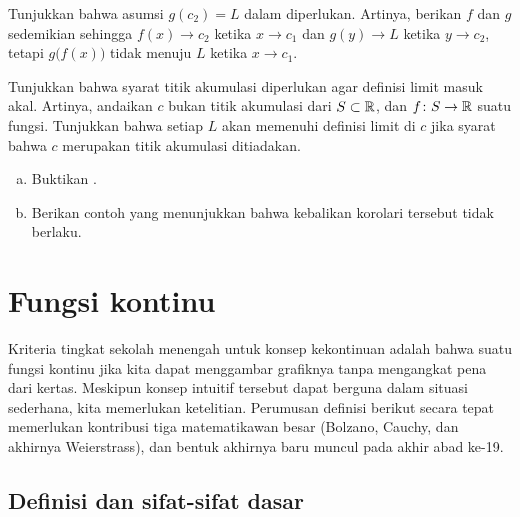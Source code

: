 \begin{exercise}[Menantang] \label{exercise:contlimitbadcomposition}
Tunjukkan bahwa asumsi $g(c_2) = L$ dalam
 diperlukan.  Artinya, berikan $f$
dan $g$ sedemikian sehingga $f(x) \to c_2$ ketika $x \to c_1$ dan
$g(y) \to L$ ketika $y \to c_2$, tetapi $g\bigl(f(x)\bigr)$ tidak menuju $L$
ketika $x \to c_1$.
\end{exercise}

\begin{exercise}
Tunjukkan bahwa syarat titik akumulasi diperlukan agar definisi limit
masuk akal.  Artinya, andaikan $c$ bukan titik akumulasi
dari $S \subset {\mathbb{R}}$, dan $f \colon S \to {\mathbb{R}}$ suatu fungsi.  Tunjukkan bahwa
setiap $L$ akan memenuhi definisi limit di $c$ jika syarat
bahwa $c$ merupakan titik akumulasi ditiadakan.
\end{exercise}

\begin{exercise}
\leavevmode
\begin{enumerate}[a)]
\item
Buktikan .
\item
Berikan contoh yang menunjukkan bahwa kebalikan
korolari tersebut tidak berlaku.
\end{enumerate}
\end{exercise}


\sectionnewpage
\section{Fungsi kontinu}
\label{sec:cont}



Kriteria tingkat sekolah menengah untuk konsep kekontinuan
adalah bahwa suatu fungsi kontinu jika
kita dapat menggambar grafiknya tanpa mengangkat pena dari kertas.  Meskipun
konsep intuitif tersebut dapat berguna dalam situasi sederhana, kita memerlukan
ketelitian.  Perumusan definisi berikut secara tepat memerlukan kontribusi tiga matematikawan besar
(Bolzano, Cauchy, dan akhirnya Weierstrass),
dan bentuk akhirnya baru muncul pada akhir abad ke-19.

\subsection{Definisi dan sifat-sifat dasar}

